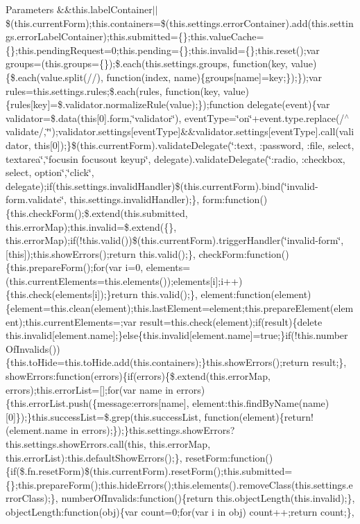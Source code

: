 {\begin{DoxyParams}{Parameters}
\&\&this.\+label\+Container$\vert$$\vert$\$(this.\+current\+Form);this.\+containers=\$(this.\+settings.\+error\+Container).add(this.\+settings.\+error\+Label\+Container);this.\+submitted=\{\};this.\+value\+Cache=\{\};this.\+pending\+Request=0;this.\+pending=\{\};this.\+invalid=\{\};this.\+reset();var groups=(this.\+groups=\{\});\$.each(this.\+settings.\+groups, function(key, value)\{\$.each(value.\+split(//), function(index, name)\{groups\mbox{[}name\mbox{]}=key;\});\});var rules=this.\+settings.\+rules;\$.each(rules, function(key, value)\{rules\mbox{[}key\mbox{]}=\$.validator.\+normalize\+Rule(value);\});function delegate(event)\{var validator=\$.data(this\mbox{[}0\mbox{]}.form,\char`\"{}validator\char`\"{}), event\+Type=\char`\"{}on\char`\"{}+event.type.\+replace(/$^\wedge$validate/,\char`\"{}\char`\"{});validator.\+settings\mbox{[}event\+Type\mbox{]}\&\&validator.\+settings\mbox{[}event\+Type\mbox{]}.call(validator, this\mbox{[}0\mbox{]});\}\$(this.\+current\+Form).validate\+Delegate(\char`\"{}\+:text, \+:password, \+:file, select, textarea\char`\"{},\char`\"{}focusin focusout keyup\char`\"{}, delegate).validate\+Delegate(\char`\"{}\+:radio, \+:checkbox, select, option\char`\"{},\char`\"{}click\char`\"{}, delegate);if(this.\+settings.\+invalid\+Handler)\$(this.\+current\+Form).bind(\char`\"{}invalid-\/form.\+validate\char`\"{}, this.\+settings.\+invalid\+Handler);\}, form\+:function()\{this.\+check\+Form();\$.extend(this.\+submitted, this.\+error\+Map);this.\+invalid=\$.extend(\{\}, this.\+error\+Map);if(!this.valid())\$(this.\+current\+Form).trigger\+Handler(\char`\"{}invalid-\/form\char`\"{}, \mbox{[}this\mbox{]});this.\+show\+Errors();return this.\+valid();\}, check\+Form\+:function()\{this.\+prepare\+Form();for(var i=0, elements=(this.\+current\+Elements=this.\+elements());elements\mbox{[}i\mbox{]};i++)\{this.\+check(elements\mbox{[}i\mbox{]});\}return this.\+valid();\}, element\+:function(element)\{element=this.\+clean(element);this.\+last\+Element=element;this.\+prepare\+Element(element);this.\+current\+Elements=;var result=this.\+check(element);if(result)\{delete this.\+invalid\mbox{[}element.\+name\mbox{]};\}else\{this.\+invalid\mbox{[}element.\+name\mbox{]}=true;\}if(!this.number\+Of\+Invalids())\{this.\+to\+Hide=this.\+to\+Hide.\+add(this.\+containers);\}this.\+show\+Errors();return result;\}, show\+Errors\+:function(errors)\{if(errors)\{\$.extend(this.\+error\+Map, errors);this.\+error\+List=\mbox{[}\mbox{]};for(var name in errors)\{this.\+error\+List.\+push(\{message\+:errors\mbox{[}name\mbox{]}, element\+:this.\+find\+By\+Name(name)\mbox{[}0\mbox{]}\});\}this.\+success\+List=\$.grep(this.\+success\+List, function(element)\{return!(element.\+name in errors);\});\}this.\+settings.\+show\+Errors?this.\+settings.\+show\+Errors.\+call(this, this.\+error\+Map, this.\+error\+List)\+:this.\+default\+Show\+Errors();\}, reset\+Form\+:function()\{if(\$.fn.\+reset\+Form)\$(this.\+current\+Form).reset\+Form();this.\+submitted=\{\};this.\+prepare\+Form();this.\+hide\+Errors();this.\+elements().remove\+Class(this.\+settings.\+error\+Class);\}, number\+Of\+Invalids\+:function()\{return this.\+object\+Length(this.\+invalid);\}, object\+Length\+:function(obj)\{var count=0;for(var i in obj) count++;return count;\}, 
\end{DoxyParams}}
